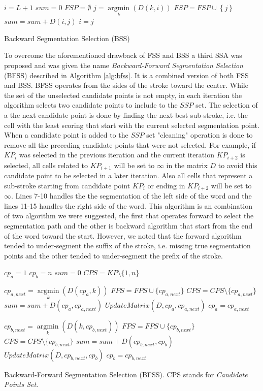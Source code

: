 \documentclass[journal,compsoc]{IEEEtran}
\begin{document}
\begin{algorithm}
$i=L+1$\;
$sum=0$\;
$FSP = \emptyset $\;
{
	$j = \mathop {\arg \min }\limits_k \left( {D\left( {k,i} \right)} \right)$\;
	$FSP = FSP \cup \left\{ j \right\}$\;
	$sum = sum + D\left( {i,j} \right)$\;
	$i=j$\;
}
\caption{Backward Segmentation Selection (BSS)}
\label{alg:bss}
\end{algorithm}

To overcome the aforementioned drawback of FSS and BSS a third SSA was proposed and was given the name \emph{Backward-Forward Segmentation Selection} (BFSS) described in Algorithm \ref{alg:bfss}. It is a combined version of both FSS and BSS. BFSS operates from the sides of the stroke toward the center. While the set of the unselected candidate points is not empty, in each iteration the algorithm selects two candidate points to include to the $SSP$ set. The selection of a the next candidate point is done by finding the next best sub-stroke, i.e. the cell with the least scoring that start with the current selected segmentation point.
When a candidate point is added to the $SSP$ set "cleaning" operation is done to remove all the preceding candidate points that were not selected. For example, if $KP_{i}$ was selected in the previous iteration and the current iteration $KP_{i+2}$ is selected, all cells related to $KP_{i+1}$ will be set to $\infty$ in the matrix $D$ to avoid this candidate point to be selected in a later iteration. Also all cells that represent a sub-stroke starting from candidate point $KP_i$ or ending in $KP_{i+2}$ will be set to $\infty$. Lines 7-10 handles the the segmentation of the left side of the word and the lines 11-15 handles the right side of the word. This algorithm is an combination of two algorithm we were suggested, the first that operates forward to select the segmentation path and the other is backward algorithm that start from the end of the word toward the start. However, we noted that the forward algorithm tended to under-segment the suffix of the stroke, i.e. missing true segmentation points and the other tended to under-segment the prefix of the stroke.  

\begin{algorithm}
$cp_{a}=1$\;
$cp_{b}=n$\;
$sum = 0$\;
$CPS = KP\setminus\{1,n\}$\;
{
	$cp_{a,next} = \mathop {\arg \min}\limits_k (D(cp_a,k))$\;
	$FPS = FPS \cup \{cp_{a,next}\}$\;
	$CPS = CPS\setminus\{cp_{a,next}\}$\;
	$sum = sum + D(cp_a,cp_{a,next})$\;
	$UpdateMatrix(D,cp_a,cp_{a,next})$\;
	$cp_{a}=cp_{a,next}$\;
	
	$cp_{b,next} = \mathop {\arg \min}\limits_k (D(k,cp_{b,next}))$\;
	$FPS = FPS \cup \{cp_{b,next}\}$\;
	$CPS = CPS\setminus\{cp_{b,next}\}$\;
	$sum = sum + D(cp_{b,next},cp_b)$\;
	$UpdateMatrix(D,cp_{b,next},cp_b)$\;
	$cp_{b}=cp_{b,next}$\;
}
\caption{Backward-Forward Segmentation Selection (BFSS). CPS stands for \emph{Candidate Points Set}. }
\label{alg:bfss}
\end{algorithm}
  
\end{document}
